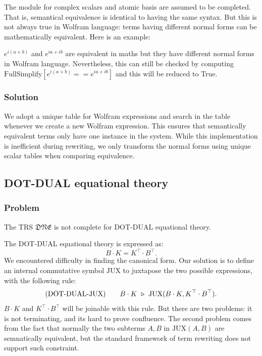 The module for complex scalars and atomic basis are assumed to be completed. That is, semantical equivalence is identical to having the same syntax. But this is not always true in Wolfram language: terms having different normal forms can be mathematically equivalent. Here is an example:

$ e^{i(a+b)} $ and $ e^{ia + ib} $ are equivalent in maths but they have different normal forms in Wolfram language. Nevertheless, this can still be checked by computing $\text{FullSimplify}[e^{i(a+b)} == e^{ia + ib}]$ and this will be reduced to True.

\subsubsection*{Solution}

We adopt a unique table for Wolfram expressions and search in the table whenever we create a new Wolfram expression. This ensures that semantically equivalent terms only have one instance in the system. While this implementation is inefficient during rewriting, we only transform the normal forms using unique scalar tables when comparing equivalence.

\subsection{\textsf{DOT-DUAL} equational theory}

\subsubsection*{Problem}
The TRS $\mathfrak{DNE}$ is not complete for \textsf{DOT-DUAL} equational theory.

The \textsf{DOT-DUAL} equational theory is expressed as:
$$
B \cdot K = K^\top \cdot B^\top.
$$
We encountered difficulty in finding the canonical form. Our solution is to define an internal commutative symbol $\textrm{JUX}$ to juxtapose the two possible expressions, with the following rule:
$$
\textrm{(DOT-DUAL-JUX)} \qquad B \cdot K \ \triangleright\  \textrm{JUX}(B \cdot K, K^\top \cdot B^\top).
$$
$B\cdot K$ and $K^\top \cdot B^\top$ will be joinable with this rule. But there are two problems: it is not terminating, and its hard to prove confluence. The second problem comes from the fact that normally the two subterms $A, B$ in $\textrm{JUX}(A, B)$ are semnatically equivalent, but the standard framework of term rewriting does not support such constraint. 

